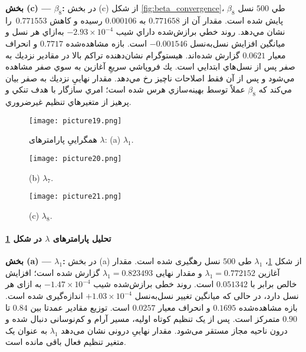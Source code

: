 \medskip
\textbf{بخش (c) — \(\beta_8\):}
در بخش (c) از شكل \ref{fig:beta_convergence}، \(\beta_8\) طي \(500\) نسل پايش شده است. مقدار آن از \(0.771658\) به \(0.000106\) رسيده و كاهش \(\,0.771553\) را نشان مي‌دهد. روند خطي برازش‌شده داراي شيب \(-2.93\times 10^{-4}\) به‌ازاي هر نسل و ميانگين افزايش نسل‌به‌نسل \(-0.001546\) است. بازه مشاهده‌شده \(0.7717\) و انحراف معيار \(0.0621\) گزارش شده‌اند. هيستوگرام نشان‌دهنده تراكم بالا در مقادير نزديك به صفر پس از نسل‌هاي ابتدايي است. يك فروپاشي سريعِ آغازين به سوي صفر مشاهده مي‌شود و پس از آن فقط اصلاحات ناچيز رخ مي‌دهد. مقدار نهاييِ نزديك به صفر بيان مي‌كند كه \(\beta_8\) عملاً توسط بهينه‌سازي هرس شده است؛ امري سازگار با هدف تنكي و پرهيز از متغيرهاي تنظيم غيرضروري.


\begin{figure}[h]
  \centering
  \texttt{[image: picture19.png]}%
  \caption{همگراییِ پارامترهای \(\lambda\): (a) \(\lambda_1\).}
  \label{fig:lambda_convergence}
\end{figure}

\begin{figure}[h]\ContinuedFloat
  \centering
  \texttt{[image: picture20.png]}%
  \caption{(b) \(\lambda_7\).}
\end{figure}

\begin{figure}[h]\ContinuedFloat
  \centering
  \texttt{[image: picture21.png]}%
  \caption{(c) \(\lambda_8\).}
\end{figure}

\paragraph{تحلیل پارامترهای \(\lambda\) در شکل \ref{fig:lambda_convergence}}

\textbf{بخش (a) — \(\lambda_1\):}
در بخش (a) از شکل \ref{fig:lambda_convergence}، \(\lambda_1\) طی \(500\) نسل رهگیری شده است. مقدار آغازین \(\lambda_1=0.772152\) و مقدار نهایی \(\lambda_1=0.823493\) گزارش شده است؛ افزایش خالص برابر با \(0.051342\) است. روند خطی برازش‌شده شیب \(-1.47\times 10^{-4}\) به ازای هر نسل دارد، در حالی که میانگین تغییر نسل‌به‌نسل \(+1.03\times 10^{-4}\) اندازه‌گیری شده است. بازه مشاهده‌شده \(0.1695\) و انحراف معیار \(0.0257\) است. توزیع مقادیر عمدتا بین \(0.84\) تا \(0.90\) متمرکز است. پس از یک تنظیم کوتاه اولیه، مسیر آرام و کم‌نوسانی دنبال شده و درون ناحیه مجاز مستقر می‌شود. مقدار نهاییِ درونی نشان می‌دهد \(\lambda_1\) به عنوان یک متغیر تنظیم فعال باقی مانده است.


